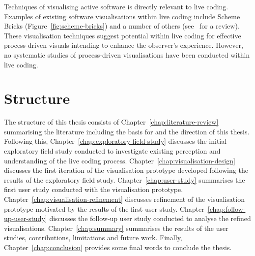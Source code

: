 Techniques of visualising active software is directly relevant to live coding. Examples of existing software visualisations within live coding include Scheme Bricks (Figure~\ref{fig:scheme-bricks}) and a number of others (see~\cite{McLean2010a} for a review). These visualisation techniques suggest potential within live coding for effective process-driven visuals intending to enhance the observer's experience. However, no systematic studies of process-driven visualisations have been conducted within live coding.



\section{Structure}

The structure of this thesis consists of Chapter~\ref{chap:literature-review} summarising the literature including the basis for and the direction of this thesis. Following this, Chapter~\ref{chap:exploratory-field-study} discusses the initial exploratory field study conducted to investigate existing perception and understanding of the live coding process. Chapter~\ref{chap:visualisation-design} discusses the first iteration of the visualisation prototype developed following the results of the exploratory field study. Chapter~\ref{chap:user-study} summarises the first user study conducted with the visualisation prototype. Chapter~\ref{chap:visualisation-refinement} discusses refinement of the visualisation prototype motivated by the results of the first user study. Chapter~\ref{chap:follow-up-user-study} discusses the follow-up user study conducted to analyse the refined visualisations. Chapter~\ref{chap:summary} summarises the results of the user studies, contributions, limitations and future work. Finally, Chapter~\ref{chap:conclusion} provides some final words to conclude the thesis.

